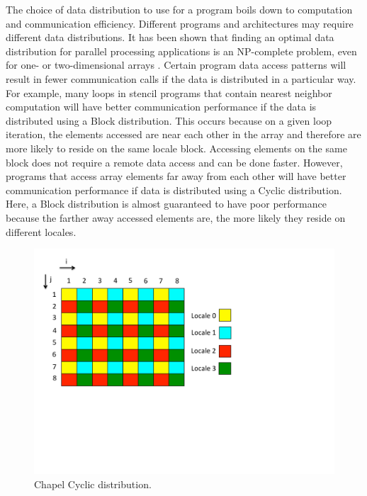 The choice of data distribution to use for a program boils down to computation and communication efficiency. Different programs and architectures may require different data distributions. It has been shown that finding an optimal data distribution for parallel processing applications is an NP-complete problem, even for one- or two-dimensional arrays \cite{mace1987memory}. Certain program data access patterns will result in fewer communication calls if the data is distributed in a particular way. For example, many loops in stencil programs that contain nearest neighbor computation will have better communication performance if the data is distributed using a Block distribution. This occurs because on a given loop iteration, the elements accessed are near each other in the array and therefore are more likely to reside on the same locale block. Accessing elements on the same block does not require a remote data access and can be done faster. However, programs that access array elements far away from each other will have better communication performance if data is distributed using a Cyclic distribution. Here, a Block distribution is almost guaranteed to have poor performance because the farther away accessed elements are, the more likely they reside on different locales. 

\begin{figure}
	\begin{center}
	\includegraphics[scale=0.50]{./Figures/cyc_dist}
	\caption{Chapel Cyclic distribution.}
	\label{cyc_dist}
	\end{center}
\end{figure}

